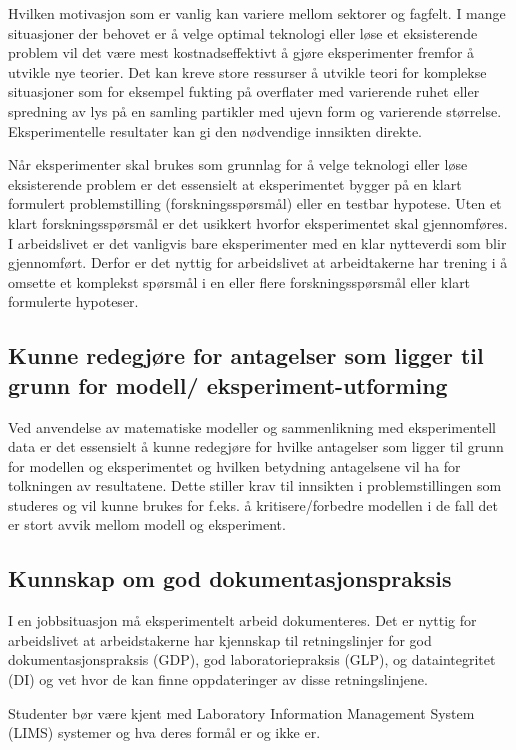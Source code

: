 \documentclass{article}
\begin{document}
Hvilken motivasjon som er vanlig kan variere mellom sektorer og fagfelt.
I mange situasjoner der behovet er å velge optimal teknologi eller løse et eksisterende problem vil det være mest kostnadseffektivt å gjøre eksperimenter fremfor å utvikle nye teorier.
Det kan kreve store ressurser å utvikle teori for komplekse situasjoner som for eksempel fukting på overflater med varierende ruhet eller spredning av lys på en samling partikler med ujevn form og varierende størrelse.
Eksperimentelle resultater kan gi den nødvendige innsikten direkte.

Når eksperimenter skal brukes som grunnlag for å velge teknologi eller løse eksisterende problem er det essensielt at eksperimentet bygger på en klart formulert problemstilling (forskningsspørsmål) eller en testbar hypotese. Uten et klart forskningsspørsmål er det usikkert hvorfor eksperimentet skal gjennomføres. I arbeidslivet er det vanligvis bare eksperimenter med en klar nytteverdi som blir gjennomført. Derfor er det nyttig for arbeidslivet at arbeidtakerne har trening i å omsette et komplekst spørsmål i en eller flere forskningsspørsmål eller klart formulerte hypoteser.

\subsection{Kunne redegjøre for antagelser som ligger til grunn for modell/ eksperiment-utforming}
Ved anvendelse av matematiske modeller og sammenlikning med eksperimentell data er det essensielt å kunne redegjøre for hvilke antagelser som ligger til grunn for modellen og eksperimentet og hvilken betydning antagelsene vil ha for tolkningen av resultatene.
Dette stiller krav til innsikten i problemstillingen som studeres og vil kunne brukes for f.eks. å kritisere/forbedre modellen i de fall det er stort avvik mellom modell og eksperiment.

\subsection{Kunnskap om god dokumentasjonspraksis}
I en jobbsituasjon må eksperimentelt arbeid dokumenteres. Det er nyttig for arbeidslivet at arbeidstakerne har kjennskap til retningslinjer for god dokumentasjonspraksis (GDP), god laboratoriepraksis (GLP), og dataintegritet (DI) og vet hvor de kan finne oppdateringer av disse retningslinjene.

Studenter bør være kjent med Laboratory Information Management System (LIMS) systemer og hva deres formål er og ikke er. 
\end{document}
